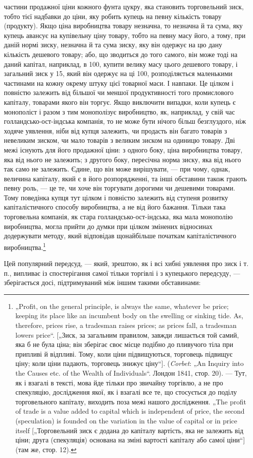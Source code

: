 \parcont{}  %
частини продажної ціни кожного фунта цукру, яка становить
торговельний зиск, тобто тієї надбавки до ціни, яку робить
купець на певну кількість товару (продукту). Якщо ціна виробництва
товару незначна, то незначна й та сума, яку купець
авансує на купівельну ціну товару, тобто на певну масу його,
а тому, при даній нормі зиску, незначна й та сума зиску, яку
він одержує на цю дану кількість дешевого товару; або, що
зводиться до того самого, він може тоді на даний капітал, наприклад,
в 100, купити велику масу цього дешевого товару,
і загальний зиск у 15, який він одержує на ці 100, розподіляється
маленькими частинами на кожну окрему штуку цієї товарної
маси. І навпаки. Це цілком і повністю залежить від більшої
чи меншої продуктивності того промислового капіталу, товарами
якого він торгує. Якщо виключити випадки, коли купець є монополіст
і разом з тим монополізує виробництво, як, наприклад,
у свій час голландсько-ост-індська компанія, то не може бути
нічого більш безглуздого, ніж ходяче уявлення, ніби від купця
залежить, чи продасть він багато товарів з невеликим зиском,
чи мало товарів з великим зиском на одиницю товару. Дві
межі існують для його продажної ціни: з одного боку, ціна виробництва
товару, яка від нього не залежить; з другого боку, пересічна
норма зиску, яка від нього так само не залежить. Єдине,
що він може вирішувати, — при чому, однак, величина капіталу,
який є в його розпорядженні, та інші обставини також грають
певну роль, — це те, чи хоче він торгувати дорогими чи дешевими
товарами. Тому поведінка купця тут цілком і повністю залежить
від ступеня розвитку капіталістичного способу виробництва,
а не від його бажання. Тільки така торговельна компанія, як стара
голландсько-ост-індська, яка мала монополію виробництва, могла
прийти до думки при цілком змінених відносинах додержувати
методу, який відповідав щонайбільше початкам капіталістичного
виробництва.\footnote{
„Profit, on the general principle, is always the same, whatever be price;
keeping its place like an incumbent body on the swelling or sinking tide. As,
therefore, prices rise, a tradesman raises prices; as prices fall, a tradesman lowers
price“. [„Зиск, за загальним правилом, завжди лишається той самий, яка б не була
ціна; він зберігає своє місце подібно до пливучого тіла при припливі й відпливі.
Тому, коли ціни підвищуються, торговець підвищує ціну; коли ціни падають,
торговець знижує ціну“]. (\emph{Corbet}: „An Inquiry into the Causes etc. of the Wealth
of Individuals“. Лондон 1841, стор. 20). — Тут, як і взагалі в тексті, мова йде
тільки про звичайну торгівлю, а не про спекуляцію, дослідження якої, як і взагалі
все те, що стосується до поділу торговельного капіталу, виходить поза
межі нашого дослідження. „The profit of trade is a value added to capital which
is independent of price, the second (speculation) is founded on the variation in
the value of capital or in price itself [„Торговельний зиск є додана до капіталу
вартість, яка не залежить від ціни; друга (спекуляція) основана на зміні вартості
капіталу або самої ціни“] (там же, стор. 12).
}

Цей популярний передсуд, — який, зрештою, як і всі хибні
уявлення про зиск і т. п., випливає із спостерігання самої тільки
торгівлі і з купецького передсуду, — зберігається досі, підтримуваний
між іншим такими обставинами:
\parbreak{}  %
